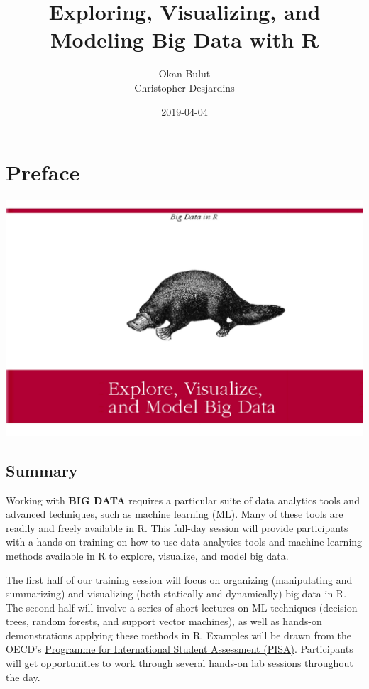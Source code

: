 \documentclass[]{book}
\title{Exploring, Visualizing, and Modeling Big Data with R}
\author{Okan Bulut \\ Christopher Desjardins}
\date{2019-04-04}
\begin{document}
\maketitle

{
\setcounter{tocdepth}{1}
\tableofcontents
}
\hypertarget{preface}{%
\chapter{Preface}\label{preface}}

\includegraphics{images/Cover2.jpg}

\hypertarget{summary}{%
\section{Summary}\label{summary}}

Working with \textbf{BIG DATA} requires a particular suite of data analytics tools and advanced techniques, such as machine learning (ML). Many of these tools are readily and freely available in \href{https://cran.r-project.org/}{R}. This full-day session will provide participants with a hands-on training on how to use data analytics tools and machine learning methods available in R to explore, visualize, and model big data.

The first half of our training session will focus on organizing (manipulating and summarizing) and visualizing (both statically and dynamically) big data in R. The second half will involve a series of short lectures on ML techniques (decision trees, random forests, and support vector machines), as well as hands-on demonstrations applying these methods in R. Examples will be drawn from the OECD's \href{http://www.oecd.org/pisa/}{Programme for International Student Assessment (PISA)}. Participants will get opportunities to work through several hands-on lab sessions throughout the day.
\end{document}
